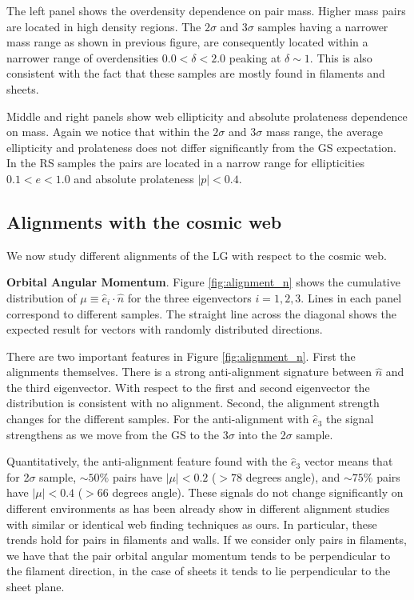 \documentclass{emulateapj}
\begin{document}
The left panel shows the overdensity dependence on pair mass. 
Higher mass pairs are located in high density regions.
The $2\sigma$ and $3\sigma$ samples having a narrower mass range as 
shown in previous figure, are consequently located within a narrower 
range of overdensities $0.0<\delta<2.0$ peaking at $\delta \sim 1$. 
This is also consistent with the fact that these samples are mostly 
found in filaments and sheets. 

Middle and right panels show web ellipticity and absolute prolateness
dependence on mass. 
Again we notice that within the $2\sigma$ and $3\sigma$ mass range,
the average ellipticity and prolateness does not differ significantly
from the GS expectation.
In the RS samples the pairs are located in a narrow range for
ellipticities $0.1<e<1.0$ and absolute prolateness $|p|<0.4$. 


\subsection{Alignments with the cosmic web}

We now study different alignments of the LG with respect to the cosmic web. 

{\bf Orbital Angular Momentum}. Figure \ref{fig:alignment_n} shows the
cumulative distribution of $\mu\equiv\hat{e}_i\cdot\hat{n}$  for the
three eigenvectors $i=1,2,3$.    
Lines in each panel correspond to different samples.
The straight line across the diagonal shows the expected
result for vectors with randomly distributed directions.


There are two important features in Figure \ref{fig:alignment_n}.
First the alignments themselves. 
There is a strong anti-alignment signature between $\hat{n}$ and the
third eigenvector. 
With respect to the first and second eigenvector the distribution is consistent
with no alignment. 
Second, the alignment strength changes for the different samples. 
For the anti-alignment with $\hat{e}_3$ the signal strengthens as we
move from the GS to the 3$\sigma$ into the 2$\sigma$ sample.

Quantitatively, the anti-alignment feature found with the $\hat{e}_3$ 
vector means that for 2$\sigma$ sample, $\sim 50\%$ pairs have
$|\mu|<0.2$ ($>78$ degrees angle), and $\sim 75\%$ pairs have $|\mu|<0.4$
($>66$ degrees angle). 
These signals do not change significantly on
different environments as has been already show in different alignment
studies with similar \citep{Libeskind2013} or identical
\citep{ForeroRomero2014} web finding techniques as ours.
In particular, these trends hold for pairs in filaments and walls.
If we consider only pairs in filaments, we have that the pair orbital
angular momentum tends to be perpendicular to the filament direction,
in the case of sheets it tends to lie perpendicular to the sheet plane.
\end{document}

